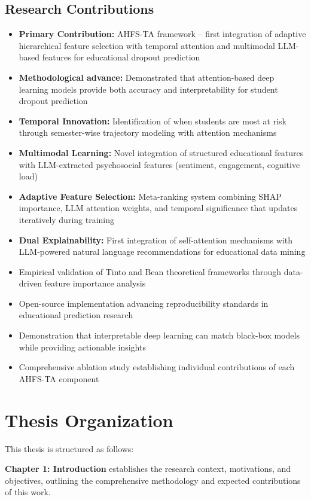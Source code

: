 \subsection{Research Contributions}
\begin{itemize}
\item \textbf{Primary Contribution:} AHFS-TA framework -- first integration of adaptive hierarchical feature selection with temporal attention and multimodal LLM-based features for educational dropout prediction
\item \textbf{Methodological advance:} Demonstrated that attention-based deep learning models provide both accuracy and interpretability for student dropout prediction
\item \textbf{Temporal Innovation:} Identification of when students are most at risk through semester-wise trajectory modeling with attention mechanisms
\item \textbf{Multimodal Learning:} Novel integration of structured educational features with LLM-extracted psychosocial features (sentiment, engagement, cognitive load)
\item \textbf{Adaptive Feature Selection:} Meta-ranking system combining SHAP importance, LLM attention weights, and temporal significance that updates iteratively during training
\item \textbf{Dual Explainability:} First integration of self-attention mechanisms with LLM-powered natural language recommendations for educational data mining
\item Empirical validation of Tinto and Bean theoretical frameworks through data-driven feature importance analysis
\item Open-source implementation advancing reproducibility standards in educational prediction research
\item Demonstration that interpretable deep learning can match black-box models while providing actionable insights
\item Comprehensive ablation study establishing individual contributions of each AHFS-TA component
\end{itemize}

\section{Thesis Organization}

This thesis is structured as follows:

\textbf{Chapter 1: Introduction} establishes the research context, motivations, and objectives, outlining the comprehensive methodology and expected contributions of this work.

